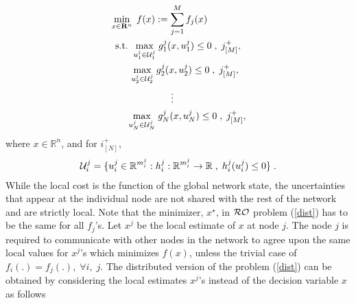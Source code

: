 \documentclass[journal,twoside,web]{ieeecolor}
\begin{document}
\begin{align} \label{dist}
&\min_{x \in \mathbf{R}^n} \;f(x):= \sum_{j=1}^M f_j(x)\\
&\;\;\text{s.t.}\;\;\underset{u_1^j\in {\cal U}_1^j}{\max}\; g^j_1(x,u^j_1)\leq 0\;,\;j^+_{[M]},\nonumber\\
&\;\;\;\;\;\;\;\;\underset{u_2^j\in {\cal U}_2^j}{\max}\; g^j_2(x,u^j_2)\leq 0\;,\;j^+_{[M]},\nonumber\\
& \;\;\;\;\;\;\;\;\;\;\;\;\;\;\;\;\;\;\;\;\;\;\; \vdots \nonumber\\
&\;\;\;\;\;\;\;\underset{u_N^j\in {\cal U}_N^j}{\max}\; g^j_N(x,u^j_N)\leq 0\;,\;j^+_{[M]},\nonumber
\end{align}
where
$x \in \mathbb{R}^n$, and for $i^+_{[N]}$,%
\begin{align*}
{\cal U}_i^j=\{u_i^j \in \mathbb{R}^{m_i^j}:h_i^j: \mathbb{R}^{m_i^j} \rightarrow \mathbb{R}\;,\;h_i^j(u_i^j) \leq 0\}\;.
\end{align*}
While the local cost is the function of the global network state, the uncertainties that appear at the individual node are not shared with the rest of the network and are strictly local. Note that the minimizer, $x^{\star}$, in ${\cal RO}$ problem (\ref{dist}) has to be the same for all $f_j$'s. Let $x^j$ be the local estimate of $x$ at node $j$. The node $j$ is required to communicate with other nodes in the network to agree upon the same local values for $x^j$'s which minimizes $f(x)$, unless the trivial case of $f_i(.)=f_j(.),\; \forall i,\;j$. The distributed version of the problem (\ref{dist}) can be obtained by considering the local estimates $x^j$'s instead of the decision variable $x$ as follows
\end{document}
